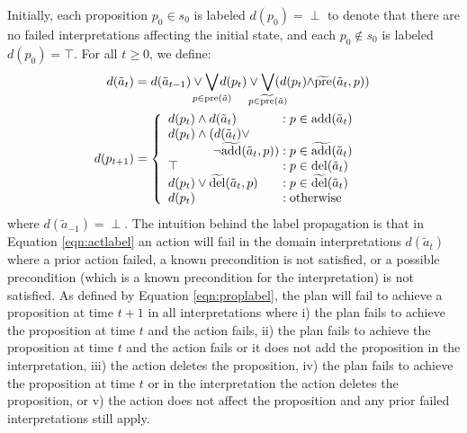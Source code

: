 \documentclass{article}
\begin{document}
Initially, each proposition $p_0 \in s_0$ is labeled $d(p_0) = \perp$ to denote that there are no failed interpretations affecting the initial state, and each $p_0 \not\in s_0$ is labeled $d(p_0)=\top$.  For all $t \geq 0$, we define: 
 \begin{align}
\label{eqn:actlabel}d(\tilde{a}_t) &=  
d(\tilde{a}_{t-1}) \vee \hspace*{-.35cm}\bigvee\limits_{p \in \text{pre}(\tilde{a})}\hspace*{-.39cm} d(p_t) \vee\hspace*{-.35cm} \bigvee\limits_{p \in \widetilde{\text{pre}}(\tilde{a})} \hspace*{-.35cm}(d(p_t)\hspace*{-.09cm}\wedge\hspace*{-.09cm} \widetilde{\text{pre}}(\tilde{a}_t, p)  ) %
\\
\label{eqn:proplabel}\hspace*{-.1cm}d(p_{t+1}) &= \left\{
\begin{array}{l@{\;}l@{\;}r}
d(p_t) \wedge d(\tilde{a}_t) & : p \in \text{add}(\tilde{a}_t) \\
d(p_t) \wedge  (d(\tilde{a}_t) \vee \\
\hspace*{1.25cm} \neg\widetilde{\text{add}}(\tilde{a}_t, p)) & : p \in \widetilde{\text{add}}(\tilde{a}_t)\\
\top & : p \in \text{del}(\tilde{a}_t)\\
d(p_t) \vee  \widetilde{\text{del}}(\tilde{a}_t, p) %
 &: p \in \widetilde{\text{del}}(\tilde{a}_t)\\
d(p_t) & : \text{otherwise} 
\end{array}
\right. 
\end{align}
\noindent where $d(\tilde{a}_{-1}) = \perp$. The intuition behind the label propagation is that in Equation \ref{eqn:actlabel} an action will fail  in the domain interpretations $d(\tilde{a}_t)$ where a prior action failed, a known precondition is not satisfied, or a possible precondition (which is a known precondition for the interpretation) is not satisfied. As defined by Equation \ref{eqn:proplabel}, the plan will fail to achieve a proposition at time $t+1$ in all interpretations where i) the plan fails to achieve the proposition at time $t$ and the action fails, ii) the plan fails to achieve the proposition at time $t$ and the action fails or it does not add the proposition in the interpretation, iii) the action deletes the proposition, iv) the plan fails to achieve the proposition at time $t$ or in the interpretation the action deletes the proposition, or v) the action does not affect the proposition and any prior failed interpretations still apply.
\end{document}
